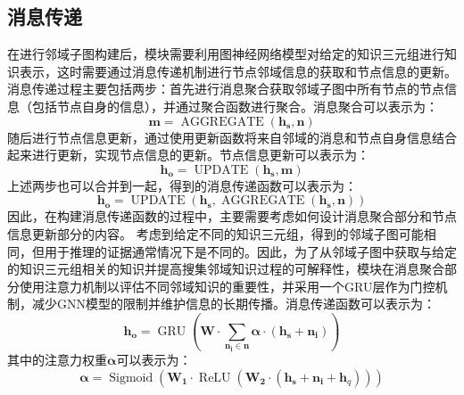 \documentclass[algorithmlist, AutoFakeBold, AutoFakeSlant, figurelist, tablelist, nomlist, engineering]{seuthesix}
\begin{document}
\subsection{消息传递}
在进行邻域子图构建后，模块需要利用图神经网络模型对给定的知识三元组进行知识表示，这时需要通过消息传递机制进行节点邻域信息的获取和节点信息的更新。
消息传递过程主要包括两步：首先进行消息聚合获取邻域子图中所有节点的节点信息（包括节点自身的信息），并通过聚合函数进行聚合。消息聚合可以表示为：
\begin{equation}
  \bm{m} = \operatorname{AGGREGATE}(\bm{h_s}, \bm{n})
\end{equation}
随后进行节点信息更新，通过使用更新函数将来自邻域的消息和节点自身信息结合起来进行更新，实现节点信息的更新。节点信息更新可以表示为：
\begin{equation}
  \bm{h_o} = \operatorname{UPDATE}(\bm{h_s}, \bm{m})
\end{equation}
上述两步也可以合并到一起，得到的消息传递函数可以表示为：
\begin{equation}
  \bm{h_o} = \operatorname{UPDATE}(\bm{h_s}, \operatorname{AGGREGATE}(\bm{h_s}, \bm{n}))
  \label{equation_MessagePassing}
\end{equation}
因此，在构建消息传递函数的过程中，主要需要考虑如何设计消息聚合部分和节点信息更新部分的内容。
考虑到给定不同的知识三元组，得到的邻域子图可能相同，但用于推理的证据通常情况下是不同的。因此，为了从邻域子图中获取与给定的知识三元组相关的知识并提高搜集邻域知识过程的可解释性，模块在消息聚合部分使用注意力机制以评估不同邻域知识的重要性，并采用一个GRU层作为门控机制，减少GNN模型的限制并维护信息的长期传播。消息传递函数可以表示为：
\begin{equation}
  \bm{h_o} = \operatorname{GRU}(\mathbf{W} \cdot \sum_{\bm{n_i} \in \bm{n}}{\bm{\alpha} \cdot (\bm{h_s} + \bm{n_i})})
  \label{equation_newMessagePassing}
\end{equation}
其中的注意力权重$\bm{\alpha}$可以表示为：
\begin{equation}
  \bm{\alpha} = \operatorname{Sigmoid}(\mathbf{W_{1}} \cdot \operatorname{ReLU}(\mathbf{W_{2}} \cdot (\bm{h_s} + \bm{n_i} + \bm{h}_q)))
  \label{equation_Alpha}
\end{equation}
\end{document}
